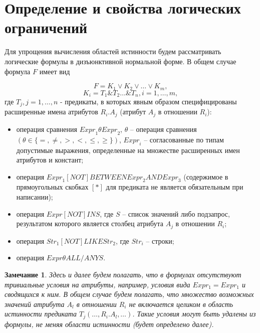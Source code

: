 \documentclass[10pt,a4paper]{article}
\newtheorem{note}{Замечание}
\def \n #1{\mathit{#1}}
\begin{document}
\section{Определение и свойства логических ограничений}

Для упрощения вычисления областей истинности будем рассматривать логические формулы в дизъюнктивной
нормальной форме. В общем случае формула $F$ имеет вид 

\begin{equation}
F = K_1 \vee K_2 \vee \dots \vee K_m ,
\label{def_F_1}
\end{equation}
\begin{equation}
K_i = T_1 \& T_2 \dots \& T_n, i = 1, \dots, m ,
\label{def_F_2}
\end{equation}
где $T_j, j = 1, \dots, n$ - предикаты, в которых явным образом
специфицированы расширенные имена атрибутов $R_i.A_j$ (атрибут $A_j$ в отношении
$R_i$):
\begin{itemize}
  \item	операция сравнения $ \n{Expr}_1 \theta \n{Expr}_2$, $\theta$ – операция
  сравнения $(\theta \in \{=, \neq, >, <, \leq, \geq\})$, $\n{Expr}_i$ –
  согласованные по типам допустимые выражения, определенные на множестве
  расширенных имен атрибутов и констант;
  \item операция $\n{Expr}_1 \n{[NOT]} \n{BETWEEN} \n{Expr}_2 \n{AND}
  \n{Expr}_3$ (содержимое в прямоугольных скобках $[*]$ для предиката не
  является обязательным при написании);
  \item операция $\n{Expr} \n{[NOT]} \n{IN} S$, где $S$ – список значений либо
  подзапрос, результатом которого является столбец атрибута $A_j$ в отношении
  $R_i$;
  \item операция $\n{Str}_1 \n{[NOT]} \n{LIKE} \n{Str}_2$, где $\n{Str}_i$ –
  строки;
  \item операция $\n{Expr} \theta \n{ALL/ANY} S$.
\end{itemize}

\begin{note}
Здесь и далее будем полагать, что в формулах отсутствуют тривиальные условия на
атрибуты, например, условия вида $Expr_1 = Expr_1$ и сводящихся к ним.
В общем случае будем полагать, что множество возможных значений атрибута $A_l$
в отношении $R_i$ не включается целиком в область истинности предиката $T_j (\dots , R_i . A_l ,\dots )$. Такие
условия могут быть удалены из формулы, не меняя области истинности (будет
определено далее).
\label{trivial}
\end{note}
\end{document}
